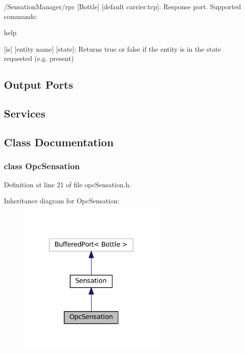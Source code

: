 \begin{DoxyItemize}
\item /\+Sensation\+Manager/rpc \mbox{[}Bottle\mbox{]} \mbox{[}default carrier\+:tcp\mbox{]}\+: Response port. Supported commands\+:
\begin{DoxyItemize}
\item help
\item \mbox{[}\textquotesingle{}is\textquotesingle{}\mbox{]} \mbox{[}entity name\mbox{]} \mbox{[}state\mbox{]}\+: Returns true or false if the entity is in the state requested (e.\+g. present)
\end{DoxyItemize}
\end{DoxyItemize}\hypertarget{group__touchDetector_outputports_sec}{}\subsection{Output Ports}\label{group__touchDetector_outputports_sec}
\hypertarget{group__touchDetector_services_sec}{}\subsection{Services}\label{group__touchDetector_services_sec}


\subsection{Class Documentation}
\label{classOpcSensation}
\subsubsection{class Opc\+Sensation}


Definition at line 21 of file opc\+Sensation.\+h.



Inheritance diagram for Opc\+Sensation\+:
\nopagebreak
\begin{figure}[H]
\begin{center}
\leavevmode
\includegraphics[width=209pt]{classOpcSensation__inherit__graph}
\end{center}
\end{figure}
